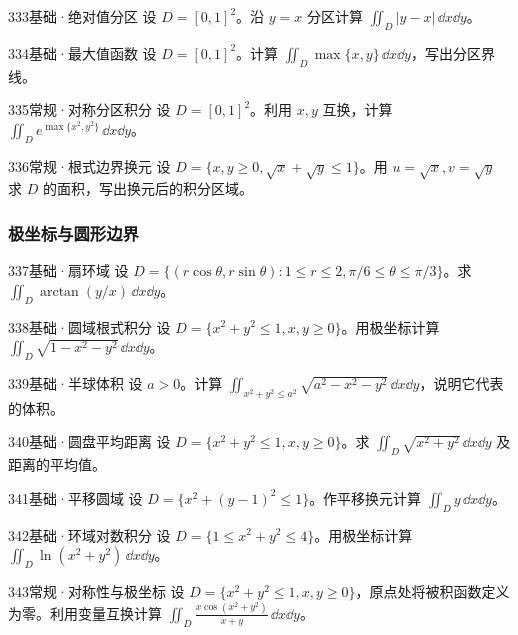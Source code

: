 \begin{exercise}{333}{基础·绝对值分区}
设 $D=[0,1]^2$。沿 $y=x$ 分区计算 $\iint_D|y-x|\,\dd x\dd y$。
\end{exercise}
\begin{exercise}{334}{基础·最大值函数}
设 $D=[0,1]^2$。计算 $\iint_D\max\{x,y\}\,\dd x\dd y$，写出分区界线。
\end{exercise}
\begin{exercise}{335}{常规·对称分区积分}
设 $D=[0,1]^2$。利用 $x,y$ 互换，计算 $\iint_De^{\max\{x^2,y^2\}}\,\dd x\dd y$。
\end{exercise}
\begin{exercise}{336}{常规·根式边界换元}
设 $D=\{x,y\geq0,\sqrt x+\sqrt y\leq1\}$。用 $u=\sqrt x,v=\sqrt y$ 求 $D$ 的面积，写出换元后的积分区域。
\end{exercise}
\subsubsection{极坐标与圆形边界}
\begin{exercise}{337}{基础·扇环域}
设 $D=\{(r\cos\theta,r\sin\theta):1\leq r\leq2,\pi/6\leq\theta\leq\pi/3\}$。求 $\iint_D\arctan(y/x)\,\dd x\dd y$。
\end{exercise}
\begin{exercise}{338}{基础·圆域根式积分}
设 $D=\{x^2+y^2\leq1,x,y\geq0\}$。用极坐标计算 $\iint_D\sqrt{1-x^2-y^2}\,\dd x\dd y$。
\end{exercise}
\begin{exercise}{339}{基础·半球体积}
设 $a>0$。计算 $\iint_{x^2+y^2\leq a^2}\sqrt{a^2-x^2-y^2}\,\dd x\dd y$，说明它代表的体积。
\end{exercise}
\begin{exercise}{340}{基础·圆盘平均距离}
设 $D=\{x^2+y^2\leq1,x,y\geq0\}$。求 $\iint_D\sqrt{x^2+y^2}\,\dd x\dd y$ 及距离的平均值。
\end{exercise}
\begin{exercise}{341}{基础·平移圆域}
设 $D=\{x^2+(y-1)^2\leq1\}$。作平移换元计算 $\iint_D y\,\dd x\dd y$。
\end{exercise}
\begin{exercise}{342}{基础·环域对数积分}
设 $D=\{1\leq x^2+y^2\leq4\}$。用极坐标计算 $\iint_D\ln(x^2+y^2)\,\dd x\dd y$。
\end{exercise}
\begin{exercise}{343}{常规·对称性与极坐标}
设 $D=\{x^2+y^2\leq1,x,y\geq0\}$，原点处将被积函数定义为零。利用变量互换计算 $\iint_D\frac{x\cos(x^2+y^2)}{x+y}\,\dd x\dd y$。
\end{exercise}

